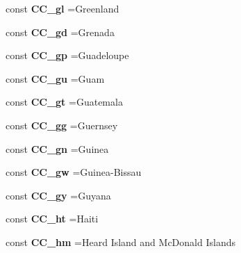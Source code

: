 \begin{DoxyCompactItemize}
const {\bfseries C\+C\+\_\+gl} =\textquotesingle{}Greenland\textquotesingle{}
\item 
\hypertarget{class_i_s_o_aeb46eac8601a43a34a6af392ce470757}{}\label{class_i_s_o_aeb46eac8601a43a34a6af392ce470757} 
const {\bfseries C\+C\+\_\+gd} =\textquotesingle{}Grenada\textquotesingle{}
\item 
\hypertarget{class_i_s_o_a867c81d85523d9020e00bd56d27d14bb}{}\label{class_i_s_o_a867c81d85523d9020e00bd56d27d14bb} 
const {\bfseries C\+C\+\_\+gp} =\textquotesingle{}Guadeloupe\textquotesingle{}
\item 
\hypertarget{class_i_s_o_aeb5b07b82e5a9817143410117bcf4a77}{}\label{class_i_s_o_aeb5b07b82e5a9817143410117bcf4a77} 
const {\bfseries C\+C\+\_\+gu} =\textquotesingle{}Guam\textquotesingle{}
\item 
\hypertarget{class_i_s_o_adfdb80172618cb4b17937686903f6350}{}\label{class_i_s_o_adfdb80172618cb4b17937686903f6350} 
const {\bfseries C\+C\+\_\+gt} =\textquotesingle{}Guatemala\textquotesingle{}
\item 
\hypertarget{class_i_s_o_a9cc1064e0066b00846ee488a6d7efdd9}{}\label{class_i_s_o_a9cc1064e0066b00846ee488a6d7efdd9} 
const {\bfseries C\+C\+\_\+gg} =\textquotesingle{}Guernsey\textquotesingle{}
\item 
\hypertarget{class_i_s_o_ae1da46cb0809e6c79a69ebab367c62a2}{}\label{class_i_s_o_ae1da46cb0809e6c79a69ebab367c62a2} 
const {\bfseries C\+C\+\_\+gn} =\textquotesingle{}Guinea\textquotesingle{}
\item 
\hypertarget{class_i_s_o_a6eb42e935783b3c34b876176a91acd29}{}\label{class_i_s_o_a6eb42e935783b3c34b876176a91acd29} 
const {\bfseries C\+C\+\_\+gw} =\textquotesingle{}Guinea-\/Bissau\textquotesingle{}
\item 
\hypertarget{class_i_s_o_a46a08a0e8c91ecc1fc8fc5db4c3fe30c}{}\label{class_i_s_o_a46a08a0e8c91ecc1fc8fc5db4c3fe30c} 
const {\bfseries C\+C\+\_\+gy} =\textquotesingle{}Guyana\textquotesingle{}
\item 
\hypertarget{class_i_s_o_af3f86a44be826b2483a3b5622225d478}{}\label{class_i_s_o_af3f86a44be826b2483a3b5622225d478} 
const {\bfseries C\+C\+\_\+ht} =\textquotesingle{}Haiti\textquotesingle{}
\item 
\hypertarget{class_i_s_o_a8bb4c15a8c5387a290211b318df3bacb}{}\label{class_i_s_o_a8bb4c15a8c5387a290211b318df3bacb} 
const {\bfseries C\+C\+\_\+hm} =\textquotesingle{}Heard Island and Mc\+Donald Islands\textquotesingle{}
\item 
\hypertarget{class_i_s_o_aee7f2a1fc2eb01ba835eb40d17e8a346}{}\label{class_i_s_o_aee7f2a1fc2eb01ba835eb40d17e8a346} 

\end{DoxyCompactItemize}
